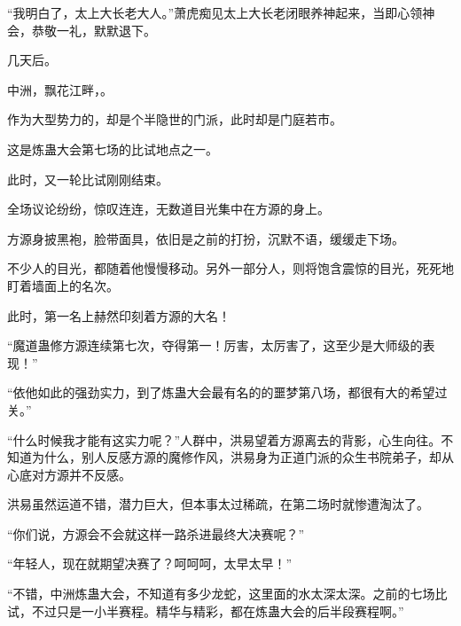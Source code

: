 \begin{this_body}
“我明白了，太上大长老大人。”萧虎痴见太上大长老闭眼养神起来，当即心领神会，恭敬一礼，默默退下。

几天后。

中洲，飘花江畔，。

作为大型势力的，却是个半隐世的门派，此时却是门庭若市。

这是炼蛊大会第七场的比试地点之一。

此时，又一轮比试刚刚结束。

全场议论纷纷，惊叹连连，无数道目光集中在方源的身上。

方源身披黑袍，脸带面具，依旧是之前的打扮，沉默不语，缓缓走下场。

不少人的目光，都随着他慢慢移动。另外一部分人，则将饱含震惊的目光，死死地盯着墙面上的名次。

此时，第一名上赫然印刻着方源的大名！

“魔道蛊修方源连续第七次，夺得第一！厉害，太厉害了，这至少是大师级的表现！”

“依他如此的强劲实力，到了炼蛊大会最有名的的噩梦第八场，都很有大的希望过关。”

“什么时候我才能有这实力呢？”人群中，洪易望着方源离去的背影，心生向往。不知道为什么，别人反感方源的魔修作风，洪易身为正道门派的众生书院弟子，却从心底对方源并不反感。

洪易虽然运道不错，潜力巨大，但本事太过稀疏，在第二场时就惨遭淘汰了。

“你们说，方源会不会就这样一路杀进最终大决赛呢？”

“年轻人，现在就期望决赛了？呵呵呵，太早太早！”

“不错，中洲炼蛊大会，不知道有多少龙蛇，这里面的水太深太深。之前的七场比试，不过只是一小半赛程。精华与精彩，都在炼蛊大会的后半段赛程啊。”

\end{this_body}

